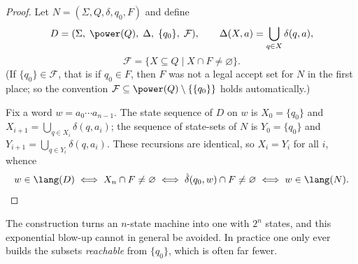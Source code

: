 \begin{proof}
	Let $N = (\Sigma, Q, \delta, q_0, F)$ and define
	$$D = (\Sigma,\; \power(Q),\; \Delta,\; \{q_0\},\; \mathcal{F}), \qquad \Delta(X, a) = \bigcup_{q \in X} \delta(q, a),$$
	$$\mathcal{F} = \{X \subseteq Q \mid X \cap F \neq \varnothing\}.$$
	(If $\{q_0\} \in \mathcal{F}$, that is if $q_0 \in F$, then $F$ was not a legal accept set for $N$ in the first place; so the convention $\mathcal{F} \subseteq \power(Q) \setminus \{\{q_0\}\}$ holds automatically.)

	Fix a word $w = a_0\cdots a_{n-1}$. The state sequence of $D$ on $w$ is $X_0 = \{q_0\}$ and $X_{i+1} = \bigcup_{q \in X_i}\delta(q, a_i)$; the sequence of state-sets of $N$ is $Y_0 = \{q_0\}$ and $Y_{i+1} = \bigcup_{q \in Y_i}\delta(q,a_i)$. These recursions are identical, so $X_i = Y_i$ for all $i$, whence
	$$w \in \lang(D) \iff X_n \cap F \neq \varnothing \iff \hat\delta(q_0,w) \cap F \neq \varnothing \iff w \in \lang(N). \qedhere$$
\end{proof}

\begin{remark}
	The construction turns an $n$-state machine into one with $2^n$ states, and this exponential blow-up cannot in general be avoided. In practice one only ever builds the subsets \emph{reachable} from $\{q_0\}$, which is often far fewer.
\end{remark}

